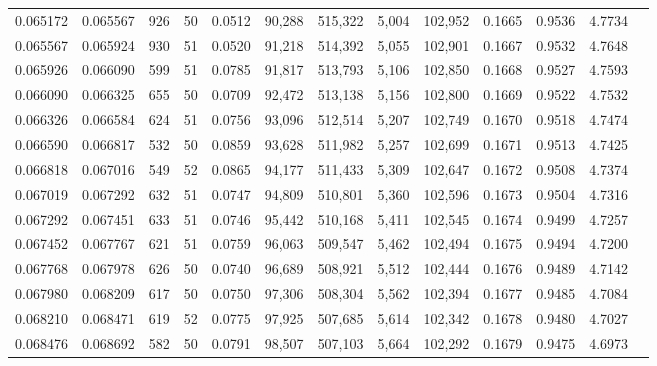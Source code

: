 \begin{tabular}{rrrrrrrrrrrrr}
0.065172 & 0.065567 &   926 &  50 &                                     0.0512 &  90,288 & 515,322 &   5,004 & 102,952 & 0.1665 & 0.9536 & 4.7734 \\
0.065567 & 0.065924 &   930 &  51 &                                     0.0520 &  91,218 & 514,392 &   5,055 & 102,901 & 0.1667 & 0.9532 & 4.7648 \\
0.065926 & 0.066090 &   599 &  51 &                                     0.0785 &  91,817 & 513,793 &   5,106 & 102,850 & 0.1668 & 0.9527 & 4.7593 \\
0.066090 & 0.066325 &   655 &  50 &                                     0.0709 &  92,472 & 513,138 &   5,156 & 102,800 & 0.1669 & 0.9522 & 4.7532 \\
0.066326 & 0.066584 &   624 &  51 &                                     0.0756 &  93,096 & 512,514 &   5,207 & 102,749 & 0.1670 & 0.9518 & 4.7474 \\
0.066590 & 0.066817 &   532 &  50 &                                     0.0859 &  93,628 & 511,982 &   5,257 & 102,699 & 0.1671 & 0.9513 & 4.7425 \\
0.066818 & 0.067016 &   549 &  52 &                                     0.0865 &  94,177 & 511,433 &   5,309 & 102,647 & 0.1672 & 0.9508 & 4.7374 \\
0.067019 & 0.067292 &   632 &  51 &                                     0.0747 &  94,809 & 510,801 &   5,360 & 102,596 & 0.1673 & 0.9504 & 4.7316 \\
0.067292 & 0.067451 &   633 &  51 &                                     0.0746 &  95,442 & 510,168 &   5,411 & 102,545 & 0.1674 & 0.9499 & 4.7257 \\
0.067452 & 0.067767 &   621 &  51 &                                     0.0759 &  96,063 & 509,547 &   5,462 & 102,494 & 0.1675 & 0.9494 & 4.7200 \\
0.067768 & 0.067978 &   626 &  50 &                                     0.0740 &  96,689 & 508,921 &   5,512 & 102,444 & 0.1676 & 0.9489 & 4.7142 \\
0.067980 & 0.068209 &   617 &  50 &                                     0.0750 &  97,306 & 508,304 &   5,562 & 102,394 & 0.1677 & 0.9485 & 4.7084 \\
0.068210 & 0.068471 &   619 &  52 &                                     0.0775 &  97,925 & 507,685 &   5,614 & 102,342 & 0.1678 & 0.9480 & 4.7027 \\
0.068476 & 0.068692 &   582 &  50 &                                     0.0791 &  98,507 & 507,103 &   5,664 & 102,292 & 0.1679 & 0.9475 & 4.6973 \\

\end{tabular}
